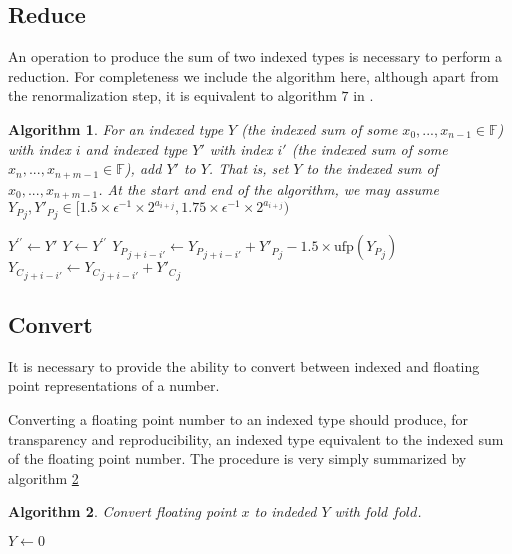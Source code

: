 \documentclass[12pt]{article}
\providecommand{\F}{\ensuremath{\mathbb{F}}}
\providecommand{\ufp}{\ensuremath{\text{ufp}}}
\theoremstyle{plain}
\newtheorem{alg}{Algorithm}[section]
\begin{document}
  \subsection{Reduce}
    An operation to produce the sum of two indexed types is necessary to perform a reduction. For completeness we include the algorithm here, although apart from the renormalization step, it is equivalent to algorithm $7$ in \cite{repsum}.
    \begin{alg}
      For an indexed type $Y$ (the indexed sum of some $x_0, ..., x_{n - 1} \in \F$) with index $i$ and indexed type $Y'$ with index $i'$ (the indexed sum of some $x_n, ..., x_{n + m - 1} \in \F$), add $Y'$ to $Y$. That is, set $Y$ to the indexed sum of $x_0, ..., x_{n + m - 1}$. At the start and end of the algorithm, we may assume ${Y_P}_j, {Y'_P}_j \in [1.5 \times \epsilon^{-1}\times 2^{a_{i + j}}, 1.75 \times \epsilon^{-1}\times 2^{a_{i + j}})$
      \begin{algorithmic}
            \State $Y^{\prime\prime} \gets Y'$
            \State {}
            \State $Y \gets Y^{\prime\prime}$
          \EndIf
            \State ${Y_P}_{j + i - i'} \gets {Y_P}_{j + i - i'} + {Y'_P}_j - 1.5 \times \ufp({Y_P}_j)$
            \State ${Y_C}_{j + i - i'} \gets {Y_C}_{j + i - i'} + {Y'_C}_j$
          \EndFor
          \State {}
        \EndFunction
      \end{algorithmic}
      \label{alg:reduce}
    \end{alg}

  \subsection{Convert}
    \label{sec:convert}
    It is necessary to provide the ability to convert between indexed and floating point representations of a number.

    Converting a floating point number to an indexed type should produce, for transparency and reproducibility, an indexed type equivalent to the indexed sum of the floating point number.
    The procedure is very simply summarized by algorithm \ref{alg:conv2indexed}
    \begin{alg}
      Convert floating point $x$ to indeded $Y$ with fold $fold$.
      \begin{algorithmic}
          \State $Y \gets 0$
          \State {}
          \State {}
          \State {}
        \EndFunction
      \end{algorithmic}
      \label{alg:conv2indexed}
    \end{alg}
\end{document}
